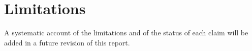 \section{Limitations}\label{sec:limits}

A systematic account of the limitations and of the status of each claim will be added in a future revision of this report.
